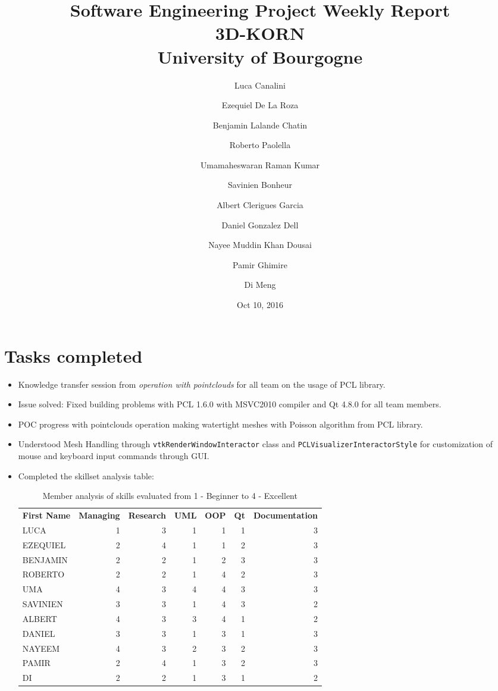 \documentclass[11pt]{article} %
\title{Software Engineering Project Weekly Report\\ \textbf{3D-KORN} \\ University of Bourgogne}
\author{Luca Canalini \and Ezequiel De La Roza \and Benjamin Lalande Chatin \and Roberto Paolella \and Umamaheswaran Raman Kumar \and Savinien Bonheur \and Albert Clerigues Garcia \and Daniel Gonzalez Dell \and Nayee Muddin Khan Dousai \and Pamir Ghimire \and Di Meng
}
\date{Oct 10, 2016} %
\begin{document}
\maketitle
\newpage

\section{Tasks completed}
\begin{itemize}
	\item Knowledge transfer session from \emph{operation with pointclouds} for all team on the usage of PCL library.
	
	\item Issue solved: Fixed building problems	with PCL 1.6.0 with MSVC2010 compiler and Qt 4.8.0 for all team members.
	
	\item POC progress with pointclouds operation making watertight meshes with Poisson algorithm from PCL library.
	
	\item Understood Mesh Handling through \texttt{vtkRenderWindowInteractor} class and \texttt{PCLVisualizerInteractorStyle} for customization of mouse and keyboard input commands through GUI.
	
	\item Completed the skillset analysis table:
\begin{table}[h]
	\centering
	\label{my-label}
	\begin{tabular}{lrrrrrr}
		\textbf{First Name}   & \textbf{Managing} & \textbf{Research} & \textbf{UML} & \textbf{OOP} & \textbf{Qt} & \textbf{Documentation} \\
		LUCA       & 1                  & 3        & 1   & 1   & 1         & 3             \\
		EZEQUIEL   & 2                  & 4        & 1   & 1   & 2         & 3             \\
		BENJAMIN   & 2                  & 2        & 1   & 2   & 3         & 3             \\
		ROBERTO    & 2                  & 2        & 1   & 4   & 2         & 3             \\
		UMA        & 4                  & 3        & 4   & 4   & 3         & 3             \\
		SAVINIEN   & 3                  & 3        & 1   & 4   & 3         & 2             \\
		ALBERT     & 4                  & 3        & 3   & 4   & 1         & 2             \\
		DANIEL     & 3                  & 3        & 1   & 3   & 1         & 3             \\
		NAYEEM     & 4                  & 3        & 2   & 3   & 2         & 3             \\
		PAMIR      & 2                  & 4        & 1   & 3   & 2         & 3             \\
		DI         & 2                  & 2        & 1   & 3   & 1         & 2                    
	\end{tabular}
\caption{Member analysis of skills evaluated from 1 - Beginner to 4 - Excellent}
\end{table}
	

\end{itemize}
\end{document}
